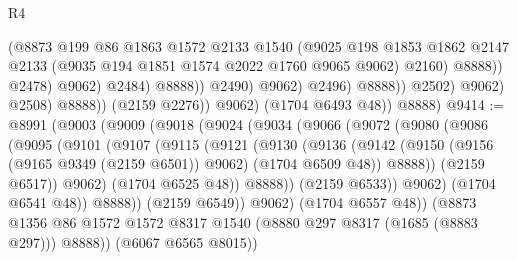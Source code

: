 \begin{lexlean}{R4}
\begin{coremodule}
                                            (@8873
                                              @199
                                              @86
                                              @1863
                                              @1572
                                              @2133
                                              @1540
                                              (@9025
                                                @198
                                                @1853
                                                @1862
                                                @2147
                                                @2133
                                                (@9035 @194 @1851 @1574 @2022 @1760 @9065 @9062)
                                                @2160)
                                              @8888))
                                          @2478)
                                        @9062)
                                      @2484)
                                    @8888))
                                @2490)
                              @9062)
                            @2496)
                          @8888))
                      @2502)
                    @9062)
                  @2508)
                @8888))
            (@2159 @2276))
          @9062)
        (@1704 @6493 @48))
      @8888)
@9414 := @8991
    (@9003
      (@9009
        (@9018
          (@9024
            (@9034
              (@9066
                (@9072
                  (@9080
                    (@9086
                      (@9095
                        (@9101
                          (@9107
                            (@9115
                              (@9121
                                (@9130
                                  (@9136
                                    (@9142
                                      (@9150
                                        (@9156 (@9165 @9349 (@2159 @6501)) @9062)
                                        (@1704 @6509 @48))
                                      @8888))
                                  (@2159 @6517))
                                @9062)
                              (@1704 @6525 @48))
                            @8888))
                        (@2159 @6533))
                      @9062)
                    (@1704 @6541 @48))
                  @8888))
              (@2159 @6549))
            @9062)
          (@1704 @6557 @48))
        (@8873 @1356 @86 @1572 @1572 @8317 @1540 (@8880 @297 @8317 (@1685 (@8883 @297))) @8888))
      (@6067 @6565 @8015))

\end{coremodule}
\end{lexlean}
